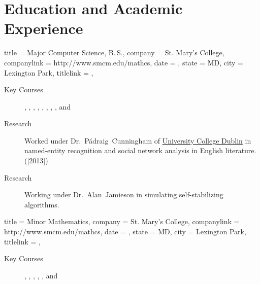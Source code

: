 \documentclass{bettercv}
\begin{document}
\section{Education and Academic Experience}
\begin{position}
  {
    title   = {Major \Dash Computer Science, B.\,S.},
    company = St. Mary's College,
    companylink = http://www.smcm.edu/mathcs,
    date    = ,
    state   = MD,
    city    = Lexington Park,
    titlelink = \transcript,
  }

\begin{description}
\item[Key Courses]
  ,
  ,
  ,
  ,
  ,
  ,
  ,
  ,
  and 
\item[Research] Worked under
  Dr.~P\'adraig~Cunningham of \href{http://www.ucd.ie}{University
    College Dublin} in named-entity recognition and social network
  analysis in English literature. ([2013])
\item[Research] Working under Dr.~Alan~Jamieson in simulating
  self-stabilizing algorithms.
\end{description}
\end{position}

\begin{position}
  {
    title   = Minor \Dash Mathematics,
    company = St. Mary's College,
    companylink = http://www.smcm.edu/mathcs,
    date    = ,
    state   = MD,
    city    = Lexington Park,
    titlelink = \transcript,
  }

  \begin{description}
  \item[Key Courses]
    ,
    ,
    ,
    ,
    ,
    and 
  \end{description}
\end{position}
\end{document}
